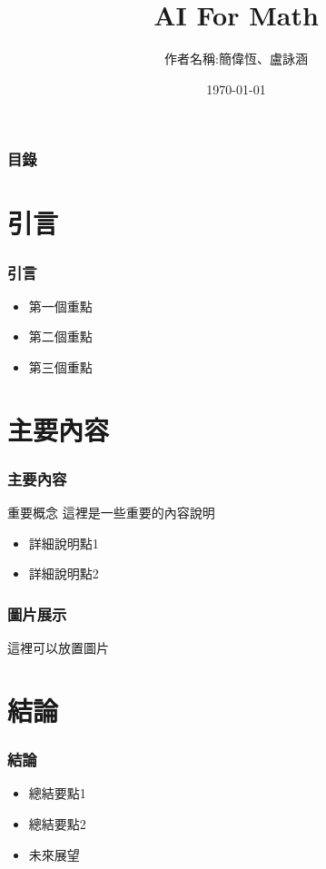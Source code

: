 \documentclass{beamer}
\title{AI For Math}
\author{作者名稱:簡偉恆、盧詠涵}
\institute{輔仁大學 數學系 資訊數學組一年級}
\date{\today}
\begin{document}
\frame{\titlepage}

\begin{frame}
    \frametitle{目錄}
    \tableofcontents
\end{frame}

\section{引言}
\begin{frame}
    \frametitle{引言}
    \begin{itemize}
        \item 第一個重點
        \item 第二個重點
        \item 第三個重點
    \end{itemize}
\end{frame}

\section{主要內容}
\begin{frame}
    \frametitle{主要內容}
    \begin{block}{重要概念}
        這裡是一些重要的內容說明
    \end{block}
    \begin{itemize}
        \item 詳細說明點1
        \item 詳細說明點2
    \end{itemize}
\end{frame}

\begin{frame}
    \frametitle{圖片展示}
    \centerline{這裡可以放置圖片}
\end{frame}

\section{結論}
\begin{frame}
    \frametitle{結論}
    \begin{itemize}
        \item 總結要點1
        \item 總結要點2
        \item 未來展望
    \end{itemize}
\end{frame}
\end{document}
